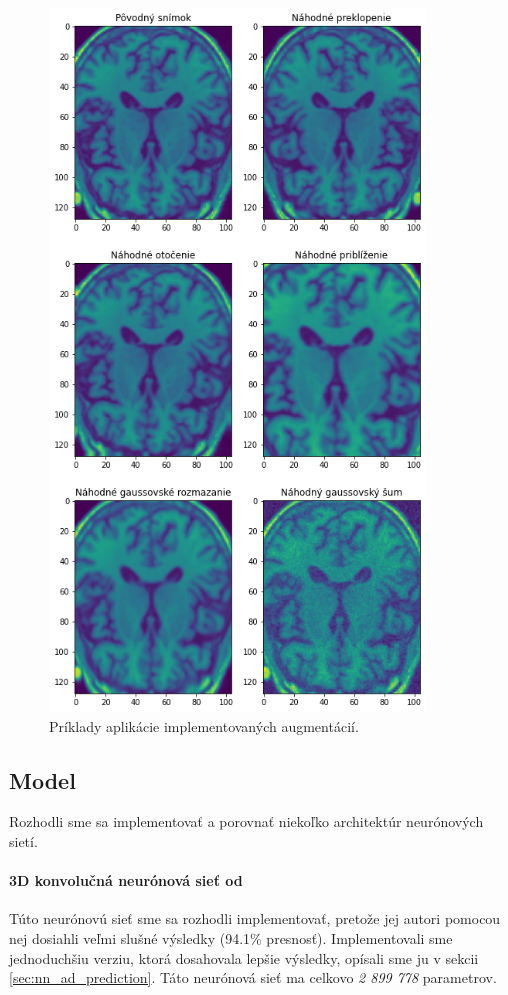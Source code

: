 \begin{figure}[h!]
    \centering
    \includegraphics[width=10cm]{assets/images/augmentations.png}
    \caption{Príklady aplikácie implementovaných augmentácií.}
    \label{fig:augmentations}
\end{figure}

\subsection{Model}

Rozhodli sme sa implementovať a porovnať niekoľko architektúr neurónových sietí.

\paragraph{3D konvolučná neurónová sieť od \citeauthor*{esmaeilzadeh2018end}} Túto neurónovú sieť sme sa rozhodli implementovať, pretože jej autori pomocou nej dosiahli veľmi slušné výsledky (94.1\% presnosť). Implementovali sme jednoduchšiu verziu, ktorá dosahovala lepšie výsledky, opísali sme ju v sekcii \ref{sec:nn_ad_prediction}. Táto neurónová sieť ma celkovo \textit{2 899 778} parametrov.

